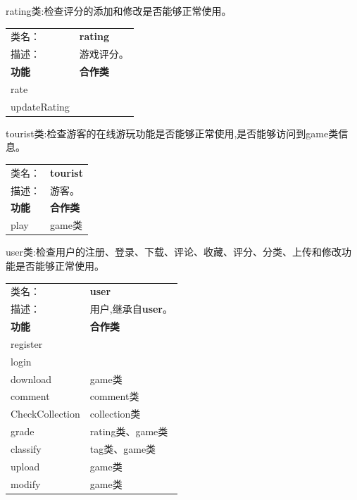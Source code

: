 \documentclass[12pt]{ctexart} %
\begin{document}
rating类:检查评分的添加和修改是否能够正常使用。
\begin{table}[H]
  \centering
  \begin{tabular}{|ll|}  %
    \cline{1-2}  %
    类名：& \textbf{rating} \\
    \cline{1-2}
    描述：& 游戏评分。 \\
    \cline{1-2}
    \multicolumn{1}{|l|}{\textbf{功能}} & {\textbf{合作类}} \\  %
    \hline
    \multicolumn{1}{|l|}{rate} &  \\
    \hline
    \multicolumn{1}{|l|}{updateRating} &  \\
    \hline
  \end{tabular}
\end{table}

tourist类:检查游客的在线游玩功能是否能够正常使用,是否能够访问到game类信息。

\begin{table}[H]
  \centering
  \begin{tabular}{|ll|}  %
    \cline{1-2}  %
    类名：& \textbf{tourist} \\
    \cline{1-2}
    描述：& 游客。 \\
    \cline{1-2}
    \multicolumn{1}{|l|}{\textbf{功能}} & {\textbf{合作类}} \\  %
    \hline
    \multicolumn{1}{|l|}{play} & {game类} \\
    \hline
  \end{tabular}
\end{table}

user类:检查用户的注册、登录、下载、评论、收藏、评分、分类、上传和修改功能是否能够正常使用。

\begin{table}[H]
  \centering
  \begin{tabular}{|ll|}  %
    \cline{1-2}  %
    类名：& \textbf{user} \\
    \cline{1-2}
    描述：& 用户,继承自\textbf{user}。 \\
    \cline{1-2}
    \multicolumn{1}{|l|}{\textbf{功能}} &{\textbf{合作类}} \\  %
    \hline
    \multicolumn{1}{|l|}{register} & \\
    \hline
    \multicolumn{1}{|l|}{login} &  \\
    \hline
    \multicolumn{1}{|l|}{download} & {game类} \\
    \hline
    \multicolumn{1}{|l|}{comment} & {comment类} \\
    \hline
    \multicolumn{1}{|l|}{CheckCollection} & {collection类} \\
    \hline
    \multicolumn{1}{|l|}{grade} & {rating类、game类} \\
    \hline
    \multicolumn{1}{|l|}{classify} & {tag类、game类} \\
    \hline
    \multicolumn{1}{|l|}{upload} & {game类} \\
    \hline
    \multicolumn{1}{|l|}{modify} & {game类} \\
    \hline
  \end{tabular}
\end{table}
\end{document}
